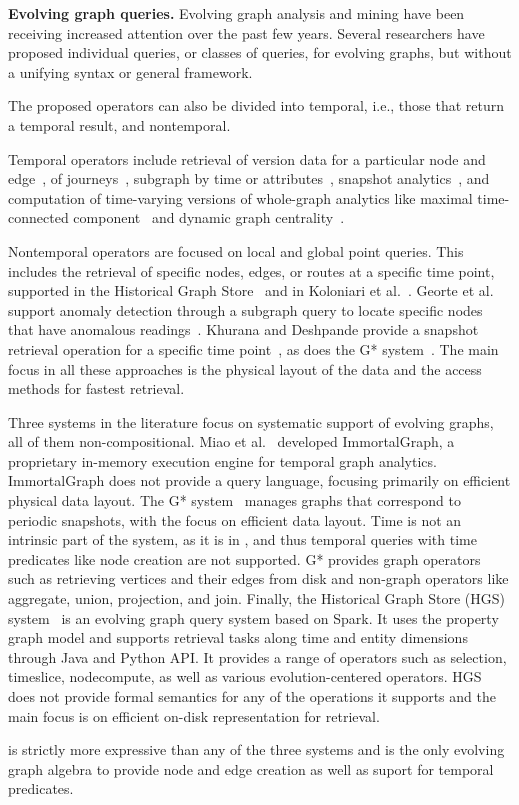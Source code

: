 {\bf Evolving graph queries.}  Evolving graph analysis and mining have
been receiving increased attention over the past few years.  Several
researchers have proposed individual queries, or classes of queries,
for evolving graphs, but without a unifying syntax or general
framework.

The proposed operators can also be divided into temporal, i.e., those
that return a temporal result, and nontemporal.

Temporal operators include retrieval of version data for a particular
node and edge~\cite{Khurana2016}, of
journeys~\cite{Casteigts2011,George2009}, subgraph by time or
attributes~\cite{Huo2014,Khurana2016}, snapshot
analytics~\cite{Khurana2016,Labouseur2015,Miao2015}, and computation
of time-varying versions of whole-graph analytics like maximal
time-connected component~\cite{Ferreira2004} and dynamic graph
centrality~\cite{Lerman2010}.

Nontemporal operators are focused on local and global point queries.
This includes the retrieval of specific nodes, edges, or routes at a
specific time point, supported in the Historical Graph
Store~\cite{Khurana2016} and in Koloniari et al.~\cite{Koloniari2012}.
Georte et al. support anomaly detection through a subgraph query to
locate specific nodes that have anomalous readings~\cite{George2009}.
Khurana and Deshpande provide a snapshot retrieval operation for a
specific time point~\cite{Khurana2013}, as does the G*
system~\cite{Labouseur2015}.  The main focus in all these approaches
is the physical layout of the data and the access methods for fastest
retrieval.


Three systems in the literature focus on systematic support of
evolving graphs, all of them non-compositional.  Miao et
al.~\cite{Miao2015} developed ImmortalGraph, a proprietary in-memory
execution engine for temporal graph analytics.  ImmortalGraph does not
provide a query language, focusing primarily on efficient physical
data layout.  The G* system~\cite{Labouseur2015} manages graphs that
correspond to periodic snapshots, with the focus on efficient data
layout.  Time is not an intrinsic part of the system, as it is in
\tga, and thus temporal queries with time predicates like node
creation are not supported.  G* provides graph operators such as
retrieving vertices and their edges from disk and non-graph operators
like aggregate, union, projection, and join.  Finally, the Historical
Graph Store (HGS) system~\cite{Khurana2016} is an evolving graph query
system based on Spark.  It uses the property graph model and supports
retrieval tasks along time and entity dimensions through Java and
Python API.  It provides a range of operators such as selection,
timeslice, nodecompute, as well as various evolution-centered operators.  HGS
does not provide formal semantics for any of the operations it
supports and the main focus is on efficient on-disk representation for
retrieval.

\tga is strictly more expressive than any of the three systems and is
the only evolving graph algebra to provide node and edge creation as
well as suport for temporal predicates.
